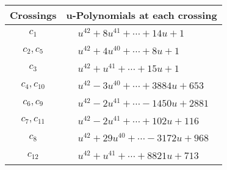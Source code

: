 \documentclass[1p]{elsarticle_modified}
\theoremstyle{definition}
\begin{document}
\begin{tabular}{m{50pt}|m{274pt}}
Crossings & \hspace{64pt}u-Polynomials at each crossing \\
\hline $$\begin{aligned}c_{1}\end{aligned}$$&$\begin{aligned}
&u^{42}+8 u^{41}+\cdots+14 u+1
\end{aligned}$\\
\hline $$\begin{aligned}c_{2},c_{5}\end{aligned}$$&$\begin{aligned}
&u^{42}+4 u^{40}+\cdots+8 u+1
\end{aligned}$\\
\hline $$\begin{aligned}c_{3}\end{aligned}$$&$\begin{aligned}
&u^{42}+u^{41}+\cdots+15 u+1
\end{aligned}$\\
\hline $$\begin{aligned}c_{4},c_{10}\end{aligned}$$&$\begin{aligned}
&u^{42}-3 u^{40}+\cdots+3884 u+653
\end{aligned}$\\
\hline $$\begin{aligned}c_{6},c_{9}\end{aligned}$$&$\begin{aligned}
&u^{42}-2 u^{41}+\cdots-1450 u+2881
\end{aligned}$\\
\hline $$\begin{aligned}c_{7},c_{11}\end{aligned}$$&$\begin{aligned}
&u^{42}-2 u^{41}+\cdots+102 u+116
\end{aligned}$\\
\hline $$\begin{aligned}c_{8}\end{aligned}$$&$\begin{aligned}
&u^{42}+29 u^{40}+\cdots-3172 u+968
\end{aligned}$\\
\hline $$\begin{aligned}c_{12}\end{aligned}$$&$\begin{aligned}
&u^{42}+u^{41}+\cdots+8821 u+713
\end{aligned}$\\
\hline
\end{tabular}\\~\\
\end{document}
